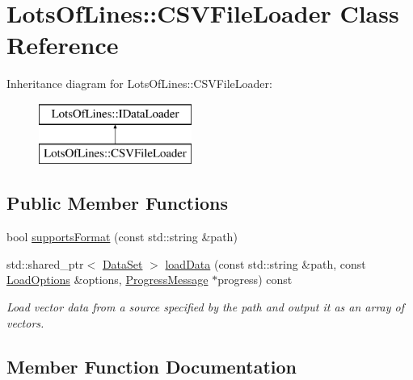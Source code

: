 \hypertarget{class_lots_of_lines_1_1_c_s_v_file_loader}{}\section{Lots\+Of\+Lines\+:\+:C\+S\+V\+File\+Loader Class Reference}
\label{class_lots_of_lines_1_1_c_s_v_file_loader}
Inheritance diagram for Lots\+Of\+Lines\+:\+:C\+S\+V\+File\+Loader\+:\begin{figure}[H]
\begin{center}
\leavevmode
\includegraphics[height=2.000000cm]{class_lots_of_lines_1_1_c_s_v_file_loader}
\end{center}
\end{figure}
\subsection*{Public Member Functions}
\begin{DoxyCompactItemize}
\item 
bool \hyperlink{class_lots_of_lines_1_1_c_s_v_file_loader_a745f53165fdb04a372e2311c8428cc3e}{supports\+Format} (const std\+::string \&path)
\item 
std\+::shared\+\_\+ptr$<$ \hyperlink{class_lots_of_lines_1_1_data_set}{Data\+Set} $>$ \hyperlink{class_lots_of_lines_1_1_c_s_v_file_loader_a7e8c7d04cf7f868ee31fc3b2d79c0a76}{load\+Data} (const std\+::string \&path, const \hyperlink{struct_lots_of_lines_1_1_load_options}{Load\+Options} \&options, \hyperlink{class_lots_of_lines_1_1_progress_message}{Progress\+Message} $\ast$progress) const 
\begin{DoxyCompactList}\small\item\em Load vector data from a source specified by the path and output it as an array of vectors. \end{DoxyCompactList}\end{DoxyCompactItemize}


\subsection{Member Function Documentation}
